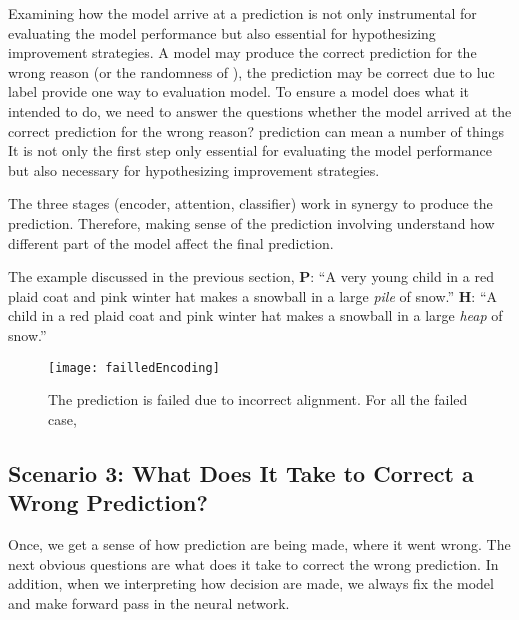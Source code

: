 Examining how the model arrive at a prediction is not only instrumental for evaluating the model performance but also essential for hypothesizing improvement strategies.
%
A model may produce the correct prediction for the wrong reason (or the randomness of ), the prediction may be correct due to luc label provide one way to evaluation model. To ensure a model does what it intended to do, we need to answer the questions whether the model arrived at the correct prediction for the wrong reason? prediction can mean a number of things
It is not only the first step  only essential for evaluating the model performance but also necessary for hypothesizing improvement strategies.

The three stages (encoder, attention, classifier) work in synergy to produce the prediction.
%
Therefore, making sense of the prediction involving understand how different part of the model affect the final prediction.
%


The example discussed in the previous section, 
\textbf{P}: ``A very young child in a red plaid coat and pink winter hat makes a snowball in a large \emph{pile} of snow.''
\textbf{H}: ``A child in a red plaid coat and pink winter hat makes a snowball in a large \emph{heap} of snow.''

\begin{figure*}[t]
\centering
\vspace{-2mm}
 \texttt{[image: failledEncoding]}
 \caption{
The prediction is failed due to incorrect alignment. For all the failed case, 
 }
\label{fig:failedEncoding}
\end{figure*}



\subsection{Scenario 3: What Does It Take to Correct a Wrong Prediction?}
Once, we get a sense of how prediction are being made, where it went wrong. The next obvious questions are what does it take to correct the wrong prediction. 
In addition, when we interpreting how decision are made, we always fix the model and make forward pass in the neural network.

